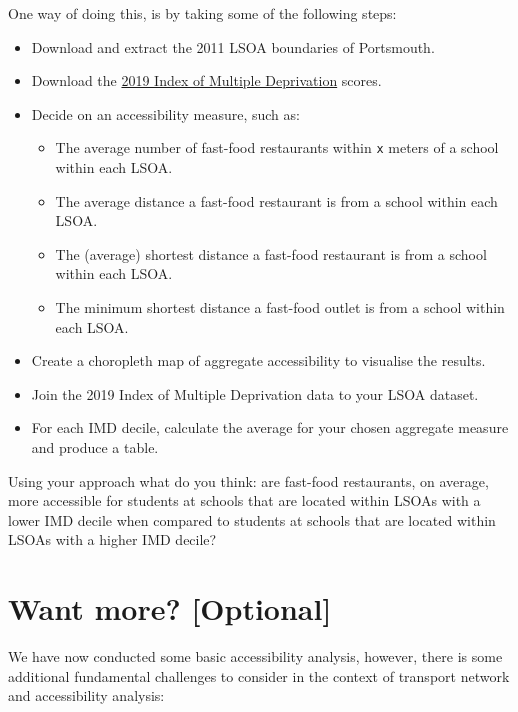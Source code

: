 \documentclass[
  letterpaper,
  DIV=11,
  numbers=noendperiod]{scrreprt}
\providecommand{\tightlist}{%
  \setlength{\itemsep}{0pt}\setlength{\parskip}{0pt}}\usepackage{longtable,booktabs,array}
\begin{document}
One way of doing this, is by taking some of the following steps:

\begin{itemize}
\tightlist
\item
  Download and extract the 2011 LSOA boundaries of Portsmouth.
\item
  Download the
  \href{https://www.gov.uk/government/statistics/english-indices-of-deprivation-2019}{2019
  Index of Multiple Deprivation} scores.
\item
  Decide on an accessibility measure, such as:

  \begin{itemize}
  \tightlist
  \item
    The average number of fast-food restaurants within \texttt{x} meters
    of a school within each LSOA.
  \item
    The average distance a fast-food restaurant is from a school within
    each LSOA.
  \item
    The (average) shortest distance a fast-food restaurant is from a
    school within each LSOA.
  \item
    The minimum shortest distance a fast-food outlet is from a school
    within each LSOA.
  \end{itemize}
\item
  Create a choropleth map of aggregate accessibility to visualise the
  results.
\item
  Join the 2019 Index of Multiple Deprivation data to your LSOA dataset.
\item
  For each IMD decile, calculate the average for your chosen aggregate
  measure and produce a table.
\end{itemize}

Using your approach what do you think: are fast-food restaurants, on
average, more accessible for students at schools that are located within
LSOAs with a lower IMD decile when compared to students at schools that
are located within LSOAs with a higher IMD decile?

\hypertarget{wm-w10}{%
\section{Want more? {[}Optional{]}}\label{wm-w10}}

We have now conducted some basic accessibility analysis, however, there
is some additional fundamental challenges to consider in the context of
transport network and accessibility analysis:
\end{document}
